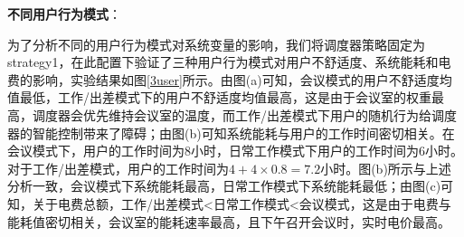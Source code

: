	\textbf{不同用户行为模式}：
	
	为了分析不同的用户行为模式对系统变量的影响，我们将调度器策略固定为strategy1，在此配置下验证了三种用户行为模式对用户不舒适度、系统能耗和电费的影响，实验结果如图\ref{3user}所示。由图(a)可知，会议模式的用户不舒适度均值最低，工作/出差模式下的用户不舒适度均值最高，这是由于会议室的权重最高，调度器会优先维持会议室的温度，而工作/出差模式下用户的随机行为给调度器的智能控制带来了障碍；由图(b)可知系统能耗与用户的工作时间密切相关。在会议模式下，用户的工作时间为8小时，日常工作模式下用户的工作时间为6小时。对于工作/出差模式，用户的工作时间为$4+4 \times 0.8=7.2$小时。图(b)所示与上述分析一致，会议模式下系统能耗最高，日常工作模式下系统能耗最低；由图(c)可知，关于电费总额，工作/出差模式<日常工作模式<会议模式，这是由于电费与能耗值密切相关，会议室的能耗速率最高，且下午召开会议时，实时电价最高。
	
